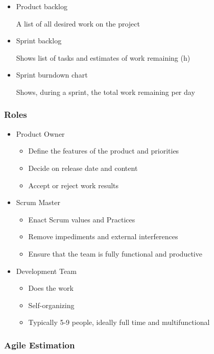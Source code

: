 \documentclass[../ESOF_notes.tex]{subfiles}
\begin{document}
\begin{itemize}
    \item Product backlog
    
    A list of all desired work on the project
    \item Sprint backlog
    
    Shows list of tasks and estimates of work remaining (h)
    \item Sprint burndown chart
    
    Shows, during a sprint, the total work remaining per day
\end{itemize}

\subsubsection{Roles}

\begin{itemize}
    \item Product Owner
    \begin{itemize}
        \item Define the features of the product and priorities
        \item Decide on release date and content
        \item Accept or reject work results
    \end{itemize}

    \item Scrum Master
    \begin{itemize}
        \item Enact Scrum values and Practices
        \item Remove impediments and external interferences
        \item Ensure that the team is fully functional and productive
    \end{itemize}
    
    \item Development Team
    \begin{itemize}
        \item Does the work
        \item Self-organizing
        \item Typically 5-9 people, ideally full time and multifunctional
    \end{itemize}
\end{itemize}

\subsubsection{Agile Estimation}
\end{document}
